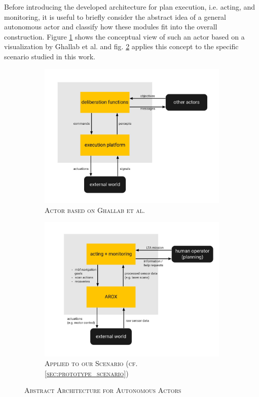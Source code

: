 \documentclass[english, master, utf8]{base/thesis_KBS}
\begin{document}
Before introducing the developed architecture for plan execution, i.e. acting, and monitoring, it is useful to briefly consider the abstract idea of a general autonomous actor and
classify how these modules fit into the overall construction. Figure \ref{fig:GNT_actor} shows the conceptual view of such an actor based on a visualization by Ghallab et al.
and fig. \ref{fig:MSC_actor} applies this concept to the specific scenario studied in this work.
\begin{figure}[H]
    \centering
    \begin{subfigure}[b]{0.49\textwidth}
        \centering
        \includegraphics[width=\textwidth]{pics/GNT_actor.png}
        \caption{\textsc{Actor based on Ghallab et al. \cite{GNT:2016}}}
        \label{fig:GNT_actor}
    \end{subfigure}
    \hfill
    \begin{subfigure}[b]{0.49\textwidth}
        \centering
        \includegraphics[width=\textwidth]{pics/MSC_actor.png}
        \caption{\textsc{Applied to our Scenario (cf. \ref{sec:prototype_scenario})}}
        \label{fig:MSC_actor}
    \end{subfigure}
\caption{\textsc{Abstract Architecture for Autonomous Actors}}
\label{fig:abstract_actor}
\end{figure}
\end{document}
